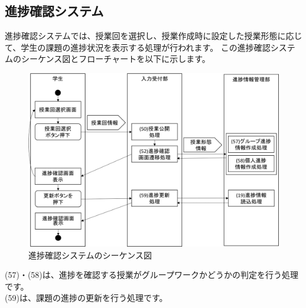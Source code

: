 \subsection{進捗確認システム}
進捗確認システムでは、授業回を選択し、授業作成時に設定した授業形態に応じて、学生の課題の進捗状況を表示する処理が行われます。
この進捗確認システムのシーケンス図とフローチャートを以下に示します。

\begin{figure}[htbp]
  \begin{center}
    \includegraphics[width=1\linewidth,clip]{./img/seq14.png}
    \caption{進捗確認システムのシーケンス図}\label{fig:seq14}
  \end{center}
\end{figure}

(57)・(58)は、進捗を確認する授業がグループワークかどうかの判定を行う処理です。\\
(59)は、課題の進捗の更新を行う処理です。

